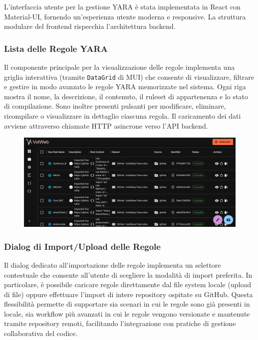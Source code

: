 L'interfaccia utente per la gestione YARA è stata implementata in React con Material-UI, fornendo un'esperienza utente moderna e responsive. La struttura modulare del frontend rispecchia l'architettura backend.

\subsubsection{Lista delle Regole YARA}

Il componente principale per la visualizzazione delle regole implementa una griglia interattiva (tramite \texttt{DataGrid} di MUI) che consente di visualizzare, filtrare e gestire in modo avanzato le regole YARA memorizzate nel sistema. Ogni riga mostra il nome, la descrizione, il contenuto, il ruleset di appartenenza e lo stato di compilazione. Sono inoltre presenti pulsanti per modificare, eliminare, ricompilare o visualizzare in dettaglio ciascuna regola. Il caricamento dei dati avviene attraverso chiamate HTTP asincrone verso l’API backend.

\begin{figure}[H]
\centering
\includegraphics[width=1\linewidth]{images/volweb-esteso/volweb-rulelist.png}
\end{figure}

\subsubsection{Dialog di Import/Upload delle Regole}
Il dialog dedicato all'importazione delle regole implementa un selettore contestuale che consente all'utente di scegliere la modalità di import preferita. In particolare, è possibile caricare regole direttamente dal file system locale (upload di file) oppure effettuare l'import di intere repository ospitate su GitHub. Questa flessibilità permette di supportare sia scenari in cui le regole sono già presenti in locale, sia workflow più avanzati in cui le regole vengono versionate e mantenute tramite repository remoti, facilitando l'integrazione con pratiche di gestione collaborativa del codice.

